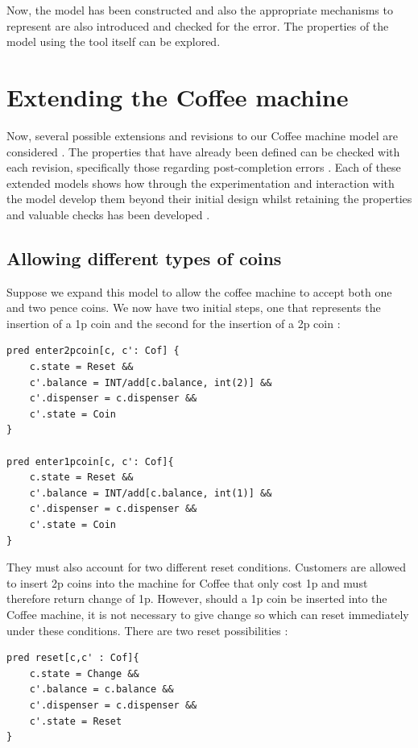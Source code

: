 \documentclass[a4paper,12pt]{report}
\begin{document}
\begin{onehalfspacing}
Now, the model has been constructed and also the appropriate mechanisms to represent are also introduced and checked for the error. The properties of the model using the tool itself can be explored. 

\section{Extending the Coffee machine}
\label{Cofee machine ext}

Now, several possible extensions and revisions to our Coffee machine model are considered \cite{RussellBoyatt}. The properties that have already been defined can be checked with each revision, specifically those regarding post-completion errors \cite{RussellBoyatt}. Each of these extended models shows how through the experimentation and interaction with the model develop them beyond their initial design whilst retaining the properties and valuable checks has been developed \cite{RussellBoyatt}.

\subsection{Allowing different types of coins}
\label{Allowing different types coins}

Suppose we expand this model to allow the coffee machine to accept both one and two pence coins. We now have two initial steps, one that represents the insertion of a 1p coin and the second for the insertion of a 2p coin \cite{RussellBoyatt}:

\begin{verbatim}
pred enter2pcoin[c, c': Cof] {
	c.state = Reset &&
	c'.balance = INT/add[c.balance, int(2)] &&
	c'.dispenser = c.dispenser &&
	c'.state = Coin
}

pred enter1pcoin[c, c': Cof]{
	c.state = Reset &&
	c'.balance = INT/add[c.balance, int(1)] &&
	c'.dispenser = c.dispenser &&
	c'.state = Coin
}
\end{verbatim}
They must also account for two different reset conditions. Customers are allowed to insert 2p coins into the machine for Coffee that only cost 1p and must therefore return change of 1p. However, should a 1p coin be inserted into the Coffee machine, it is not necessary to give change so which can reset immediately under these conditions. There are two reset possibilities \cite{RussellBoyatt}:

\begin{verbatim}
pred reset[c,c' : Cof]{
	c.state = Change &&
	c'.balance = c.balance &&
	c'.dispenser = c.dispenser &&
	c'.state = Reset
}


\end{verbatim}
\end{onehalfspacing}
\end{document}
